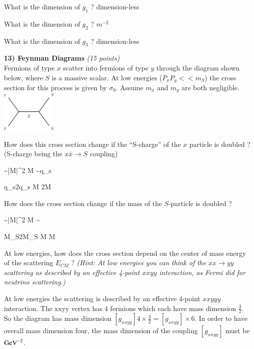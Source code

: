 {\bi
\item[a)] What is the dimension of $g_1$ ?   dimension-less 

\item[b)] What is the dimension of $g_2$ ?  $m^{-2}$
  
\item[c)] What is the dimension of $g_3$ ?  dimension-less 

\ei


\textbf{13) Feynman Diagrams }\hfill \textit{(15 points)}\\
Fermions of type $x$ scatter into fermions of type $y$ through the diagram shown below, where $S$ is a massive scalar. 
At low energies ($P_x P_y << m_S$) the cross section for this process is given by $\sigma_0$.
Assume $m_x$ and $m_y$ are both negligible. 
\bc
\includegraphics[width=0.2\textwidth]{./xxToyy.pdf}
\ec
\bi
\item[a)] How does this cross section change if the ``S-charge'' of the $x$ particle is doubled ? \\ (S-charge being the $x\bar{x} \rightarrow S$ coupling) 

\be
\sigma \sim |M|^2 \hspace*{0.5in} M \sim q_s
\ee

\be
q_s\rightarrow 2q_s \Rightarrow M \rightarrow 2M \Rightarrow \sigma {}\sigma
\ee


\item[b)] How does the cross section change if the mass of the $S$-particle is doubled ?

\be
\sigma \sim |M|^2 \hspace*{0.5in} M \sim {}
\ee

\be
M_S\rightarrow 2M_S \Rightarrow M \rightarrow {}M \Rightarrow \sigma \rightarrow {}\sigma
\ee


\item[c)] At low energies, how does the cross section depend on the center of mass energy of the scattering $E_{CM}$ ? 
\textit{(Hint: At low energies you can think of the $xx \rightarrow yy$ scattering as described by an effective 4-point $xxyy$ interaction, as Fermi did for neutrino scattering.)}

At low energies the scattering is described by an effective 4-point $xxyyy$ interaction.
The xxyy vertex has 4 fermions which each have mass dimension $\frac{3}{2}$.  
So the diagram has mass dimension $[g_{xxyy}] 4 \times \frac{3}{2} = [g_{xxyy}] \times 6$. 
In order to have overall mass dimension four, the mass dimension of the coupling $[g_{xxyy}]$ must be $\textrm{GeV}^{-2}$.

}

